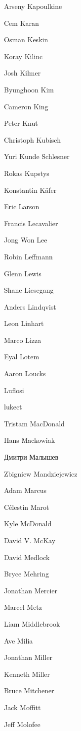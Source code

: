 \begin{DoxyItemize}
\item Arseny Kapoulkine
\item Cem Karan
\item Osman Keskin
\item Koray Kilinc
\item Josh Kilmer
\item Byunghoon Kim
\item Cameron King
\item Peter Knut
\item Christoph Kubisch
\item Yuri Kunde Schlesner
\item Rokas Kupstys
\item Konstantin Käfer
\item Eric Larson
\item Francis Lecavalier
\item Jong Won Lee
\item Robin Leffmann
\item Glenn Lewis
\item Shane Liesegang
\item Anders Lindqvist
\item Leon Linhart
\item Marco Lizza
\item Eyal Lotem
\item Aaron Loucks
\item Luflosi
\item lukect
\item Tristam Mac\+Donald
\item Hans Mackowiak
\item Дмитри Малышев
\item Zbigniew Mandziejewicz
\item Adam Marcus
\item Célestin Marot
\item Kyle Mc\+Donald
\item David V. Mc\+Kay
\item David Medlock
\item Bryce Mehring
\item Jonathan Mercier
\item Marcel Metz
\item Liam Middlebrook
\item Ave Milia
\item Jonathan Miller
\item Kenneth Miller
\item Bruce Mitchener
\item Jack Moffitt
\item Jeff Molofee

\end{DoxyItemize}
